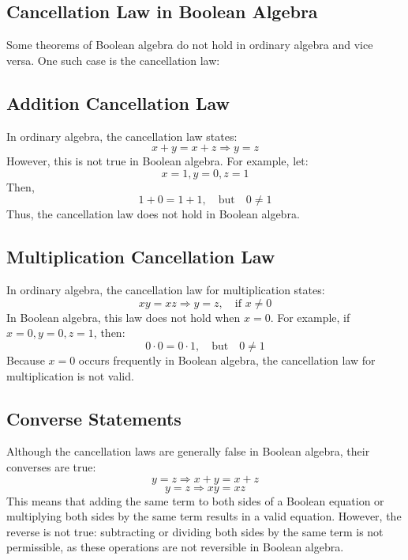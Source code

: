 \documentclass{article}
\begin{document}
\subsection{Cancellation Law in Boolean Algebra}

Some theorems of Boolean algebra do not hold in ordinary algebra and vice versa. One such case is the cancellation law:

\subsection{Addition Cancellation Law}
In ordinary algebra, the cancellation law states:
\[
    x + y = x + z \Rightarrow y = z
\]
However, this is not true in Boolean algebra. For example, let:
\[ x = 1, y = 0, z = 1 \]
Then,
\[
    1 + 0 = 1 + 1, \quad \text{but} \quad 0 \neq 1
\]
Thus, the cancellation law does not hold in Boolean algebra.

\subsection{Multiplication Cancellation Law}
In ordinary algebra, the cancellation law for multiplication states:
\[
    xy = xz \Rightarrow y = z, \quad \text{if } x \neq 0
\]
In Boolean algebra, this law does not hold when \( x = 0 \). For example, if \( x = 0, y = 0, z = 1 \), then:
\[
    0 \cdot 0 = 0 \cdot 1, \quad \text{but} \quad 0 \neq 1
\]
Because \( x = 0 \) occurs frequently in Boolean algebra, the cancellation law for multiplication is not valid.

\subsection{Converse Statements}
Although the cancellation laws are generally false in Boolean algebra, their converses are true:
\[
    y = z \Rightarrow x + y = x + z
\]
\[
    y = z \Rightarrow xy = xz
\]
This means that adding the same term to both sides of a Boolean equation or multiplying both sides by the same term results in a valid equation. However, the reverse is not true: subtracting or dividing both sides by the same term is not permissible, as these operations are not reversible in Boolean algebra.
\end{document}
